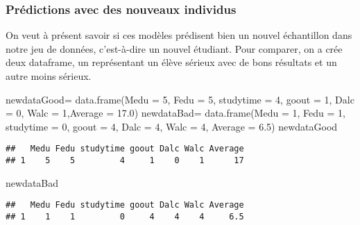 \documentclass[
]{article}
\newenvironment{Shaded}{\begin{snugshade}}{\end{snugshade}}
\newcommand{\AttributeTok}[1]{\textcolor[rgb]{0.77,0.63,0.00}{#1}}
\newcommand{\DecValTok}[1]{\textcolor[rgb]{0.00,0.00,0.81}{#1}}
\newcommand{\FloatTok}[1]{\textcolor[rgb]{0.00,0.00,0.81}{#1}}
\newcommand{\FunctionTok}[1]{\textcolor[rgb]{0.00,0.00,0.00}{#1}}
\newcommand{\NormalTok}[1]{#1}
\newcommand{\OtherTok}[1]{\textcolor[rgb]{0.56,0.35,0.01}{#1}}
\begin{document}
\hypertarget{pruxe9dictions-avec-des-nouveaux-individus}{%
\subsubsection{Prédictions avec des nouveaux
individus}\label{pruxe9dictions-avec-des-nouveaux-individus}}

On veut à présent savoir si ces modèles prédisent bien un nouvel
échantillon dans notre jeu de données, c'est-à-dire un nouvel étudiant.
Pour comparer, on a crée deux dataframe, un représentant un élève
sérieux avec de bons résultats et un autre moins sérieux.

\begin{Shaded}
\begin{Highlighting}[]
\NormalTok{newdataGood}\OtherTok{=} \FunctionTok{data.frame}\NormalTok{(}\AttributeTok{Medu =} \DecValTok{5}\NormalTok{, }\AttributeTok{Fedu =} \DecValTok{5}\NormalTok{, }\AttributeTok{studytime =} \DecValTok{4}\NormalTok{, }\AttributeTok{goout =} \DecValTok{1}\NormalTok{, }\AttributeTok{Dalc =} \DecValTok{0}\NormalTok{, }\AttributeTok{Walc =} \DecValTok{1}\NormalTok{,}\AttributeTok{Average =} \FloatTok{17.0}\NormalTok{)}
\NormalTok{newdataBad}\OtherTok{=} \FunctionTok{data.frame}\NormalTok{(}\AttributeTok{Medu =} \DecValTok{1}\NormalTok{, }\AttributeTok{Fedu =} \DecValTok{1}\NormalTok{, }\AttributeTok{studytime =} \DecValTok{0}\NormalTok{, }\AttributeTok{goout =} \DecValTok{4}\NormalTok{, }\AttributeTok{Dalc =} \DecValTok{4}\NormalTok{, }\AttributeTok{Walc =} \DecValTok{4}\NormalTok{, }\AttributeTok{Average =} \FloatTok{6.5}\NormalTok{)}
\NormalTok{newdataGood}
\end{Highlighting}
\end{Shaded}

\begin{verbatim}
##   Medu Fedu studytime goout Dalc Walc Average
## 1    5    5         4     1    0    1      17
\end{verbatim}

\begin{Shaded}
\begin{Highlighting}[]
\NormalTok{newdataBad}
\end{Highlighting}
\end{Shaded}

\begin{verbatim}
##   Medu Fedu studytime goout Dalc Walc Average
## 1    1    1         0     4    4    4     6.5
\end{verbatim}
\end{document}
